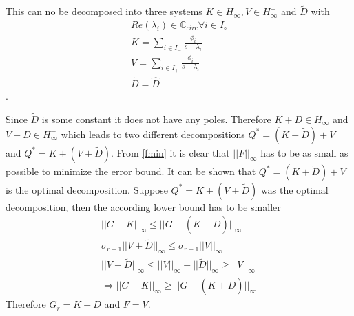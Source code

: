 This can no be decomposed into three systems \(K \in H_\infty, V \in H_{\infty}^-\) and \(\tilde{D}\) with
\begin{gather}
Re(\lambda_i) \in \mathbb{C}_{circ} \forall i \in I_{\circ} \\
K = \sum_{i \in I_-} \frac{\phi_i}{s-\lambda_i} \\
V = \sum_{i \in I_+} \frac{\phi_i}{s-\lambda_i} \\
\tilde{D} = \hat{D}
\end{gather}
.


Since \(\tilde{D}\) is some constant it does not have any poles.
Therefore \(K + D \in H_\infty\) and \(V + D \in H_{\infty}^-\) which leads to two different decompositions \(Q^{*} = (K + \tilde{D}) + V \) and \(Q^{*} = K + (V + \tilde{D})\).
From \ref{fmin} it is clear that \(||F||_{\infty}\) has to be as small as possible to minimize the error bound.
It can be shown that \(Q^{*} = (K + \tilde{D}) + V \) is the optimal decomposition.
Suppose \(Q^{*} = K + (V + \tilde{D})\) was the optimal decomposition, then the according lower bound has to be smaller
\begin{gather}
||G-K||_{\infty} \leq ||G-(K+\tilde{D})||_{\infty} \\
\sigma_{r+1}||V + \tilde{D}||_{\infty} \leq \sigma_{r+1}||V||_{\infty} \\
||V + \tilde{D}||_{\infty} \leq ||V||_{\infty} + ||\tilde{D}||_{\infty} \geq ||V||_{\infty} \\
\Rightarrow ||G-K||_{\infty} \geq ||G-(K+\tilde{D})||_{\infty}
\end{gather}
Therefore \(G_r = K + D\) and \(F = V\).